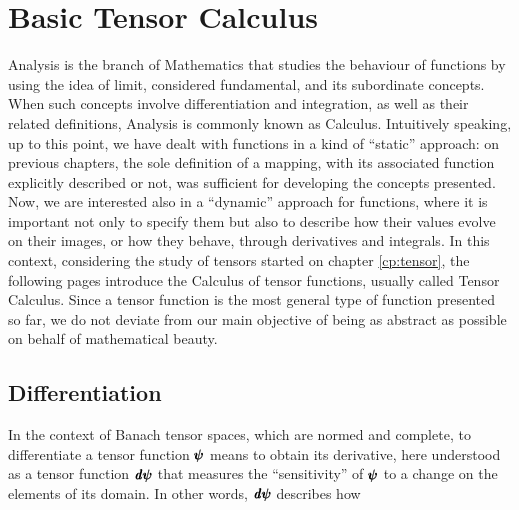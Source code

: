 
\chapter{Basic Tensor Calculus}

Analysis is the branch of Mathematics that studies the behaviour of functions by using the idea of limit, considered fundamental, and its subordinate concepts. When such concepts involve  differentiation and integration, as well as their related definitions, Analysis is commonly known as Calculus. Intuitively speaking, up to this point, we have dealt with functions in a kind of ``static'' approach: on previous chapters, the sole definition of a mapping, with its associated function explicitly described or not, was sufficient for developing the concepts presented. Now, we are interested also in a ``dynamic'' approach for functions, where it is important not only to specify them but also to describe how their values evolve on their images, or how they behave, through derivatives and integrals. In this context, considering the study of tensors started on chapter \ref{cp:tensor}, the following pages introduce the Calculus of tensor functions, usually called Tensor Calculus. Since a tensor function is the most general type of function presented so far, we do not deviate from our main objective of being as abstract as possible on behalf of mathematical beauty.  



\section{Differentiation}

In the context of Banach tensor spaces, which are normed and complete, to differentiate a tensor function $\pmb{\psi}$ means to obtain its derivative, here understood as a tensor function $\pmb{\mathit{d}\psi}$ that measures the ``sensitivity'' of $\pmb{\psi}$ to a change on the elements of its domain. In other words, $\pmb{\mathit{d}\psi}$ describes how
